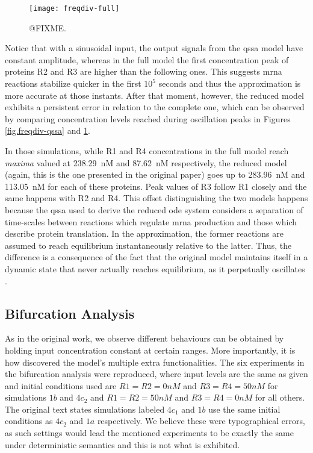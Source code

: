     \begin{figure}[!htbp]
      \centering
      \texttt{[image: freqdiv-full]}
      \caption{@FIXME.}
      \label{fig.freqdiv-full}
    \end{figure}

    Notice that with a sinusoidal input, the output signals from the \ac{qssa} model have constant amplitude, whereas in the full model the first concentration peak of proteins R2 and R3 are higher than the following ones.
    This suggests \acs{mrna} reactions stabilize quicker in the first $10^5$ seconds and thus the approximation is more accurate at those instants.
    After that moment, however, the reduced model exhibits a persistent error in relation to the complete one, which can be observed by comparing concentration levels reached during oscillation peaks in Figures \ref{fig.freqdiv-qssa} and \ref{fig.freqdiv-full}.

    In those simulations, while R1 and R4 concentrations in the full model reach \textit{maxima} valued at \SI{238.29}{\nano M} and \SI{87.62}{\nano M} respectively, the reduced model (again, this is the one presented in the original paper) goes up to \SI{283.96}{\nano M} and \SI{113.05}{\nano M} for each of these proteins.
    Peak values of R3 follow R1 closely and the same happens with R2 and R4.
    This offset distinguishing the two models happens because the \ac{qssa} used to derive the reduced \ac{ode} system considers a separation of time-scales between reactions which regulate \acs{mrna} production and those which describe protein translation.
    In the approximation, the former reactions are assumed to reach equilibrium instantaneously relative to the latter.
    Thus, the difference is a consequence of the fact that the original model maintains itself in a dynamic state that never actually reaches equilibrium, as it perpetually oscillates \cite{ingalls}.


  \subsection{Bifurcation Analysis}

    As in the original work, we observe different behaviours can be obtained by holding input concentration constant at certain ranges.
    More importantly, it is how \citet{originals} discovered the model's multiple extra functionalities.
    The six experiments in the bifurcation analysis were reproduced, where input levels are the same as given and initial conditions used are $R1=R2=0nM$ and $R3=R4=50nM$ for simulations $1b$ and $4c_{2}$ and $R1=R2=50nM$ and $R3=R4=0nM$ for all others.
    The original text states simulations labeled $4c_{1}$ and $1b$ use the same initial conditions as $4c_{2}$ and $1a$ respectively.
    We believe these were typographical errors, as such settings would lead the mentioned experiments to be exactly the same under deterministic semantics and this is not what is exhibited.

